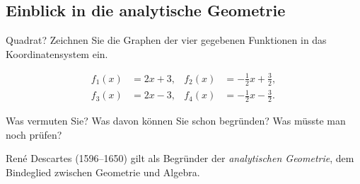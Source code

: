 \subsection{Einblick in die analytische Geometrie}
\begin{LA}
    {}{Quadrat?}
    Zeichnen Sie die Graphen der vier gegebenen Funktionen
    in das Koordinatensystem ein.

    \[
        \begin{aligned}
            f_1(x) & = 2x+3,               &
            f_2(x) & = -\frac12 x+\frac32,   \\[4pt]
            f_3(x) & = 2x-3,               &
            f_4(x) & = -\frac12 x-\frac32.
        \end{aligned}
    \]

    \begin{center}
    \end{center}

    Was vermuten Sie? Was davon können Sie schon begründen? Was müsste man noch prüfen?
\end{LA}

\clearpage


René Descartes (1596--1650) gilt als Begründer der
\emph{analytischen Geometrie}, dem Bindeglied zwischen
Geometrie und Algebra.

